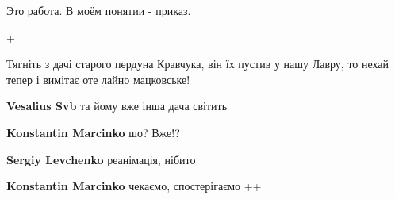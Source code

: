 \begin{itemize}
\begin{itemize}
Это работа. В моём понятии - приказ.
\end{itemize}

 
+

 
Тягніть з дачі старого пердуна Кравчука, він їх пустив у нашу Лавру, то нехай тепер і вимітає оте лайно мацковське!

\begin{itemize}
 
\textbf{Vesalius Svb} та йому вже інша дача світить

 
\textbf{Konstantin Marcinko} шо? Вже!? 🤔

 
\textbf{Sergiy Levchenko} реанімація, нібито

 
\textbf{Konstantin Marcinko} чекаємо, спостерігаємо ++

 

\end{itemize}
\end{itemize}
